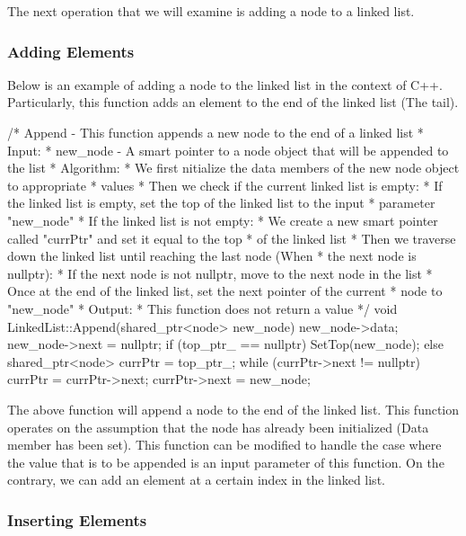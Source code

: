 The next operation that we will examine is adding a node to a linked list.

\begin{highlight}

\subsubsection*{Adding Elements}

Below is an example of adding a node to the linked list in the context of C++. Particularly, this function adds an element to the end of the linked list (The tail).

\begin{code}
/*  Append - This function appends a new node to the end of a linked list
*   Input:
*     new_node - A smart pointer to a node object that will be appended to the list
*   Algorithm:
*     We first nitialize the data members of the new node object to appropriate 
*     values
*     Then we check if the current linked list is empty:
*       If the linked list is empty, set the top of the linked list to the input 
*       parameter "new_node"
*       If the linked list is not empty:
*       We create a new smart pointer called "currPtr" and set it equal to the top 
*       of the linked list
*       Then we traverse down the linked list until reaching the last node (When 
*       the next node is nullptr):
*       If the next node is not nullptr, move to the next node in the list
*       Once at the end of the linked list, set the next pointer of the current 
*       node to "new_node"
*   Output:
*     This function does not return a value
*/
void LinkedList::Append(shared_ptr<node> new_node){
    new_node->data;
    new_node->next = nullptr;
    if (top_ptr_ == nullptr) {
        SetTop(new_node);
    }
    else {
        shared_ptr<node> currPtr = top_ptr_;
        while (currPtr->next != nullptr) {
            currPtr = currPtr->next;
        }
        currPtr->next = new_node;
    }
}
\end{code}

The above function will append a node to the end of the linked list. This function operates on the assumption that the node has already been initialized (Data member has been set). This function can
be modified to handle the case where the value that is to be appended is an input parameter of this function. On the contrary, we can add an element at a certain index in the linked list.

\subsubsection*{Inserting Elements}


\end{highlight}
